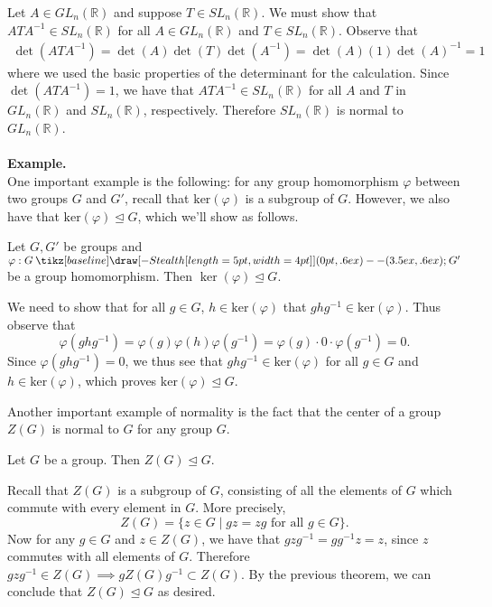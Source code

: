 \documentclass[12pt,letterpaper]{algebra_book}
\renewcommand{\to}{\mathbin{\tikz[baseline] \draw[-{Stealth[length=5pt,width=4pt]}] (0pt,.6ex) -- (3.5ex,.6ex);}}
\newcommand{\normal}{\unlhd}
\renewcommand{\phi}{\varphi}
\theoremstyle{definition}
\begin{document}
    Let $A \in GL_n(\mathbb{R})$ and suppose $T
    \in SL_n(\mathbb{R})$. We must show that $ATA^{-1} \in
    SL_n(\mathbb{R})$ for all $A \in GL_n(\mathbb{R})$ and $T \in
    SL_n(\mathbb{R})$. Observe that 
    \begin{align*}
        \det(ATA^{-1}) = \det(A)\det(T)\det(A^{-1})
        = \det(A)(1)\det(A)^{-1} = 1
    \end{align*}
    where we used the basic properties of the determinant for the
    calculation. Since $\det(ATA^{-1}) = 1$, we have that $ATA^{-1}
    \in SL_n(\mathbb{R})$ for all $A$ and $T$ in $GL_n(\mathbb{R})$
    and $SL_n(\mathbb{R})$, respectively. Therefore $SL_n(\mathbb{R})$
    is normal to $GL_n(\mathbb{R})$.   
    \\
    \\
    \textbf{Example.}
    \\
    One important example is the following: for any group homomorphism
    $\phi$ between two groups $G$ and $G'$, recall that
    $\mbox{ker}(\phi)$ is a subgroup of $G$. However, we also have
    that $\mbox{ker}(\phi) \normal G$, which we'll show as follows.

    \begin{proposition}
        Let $G, G'$ be groups and $\phi: G \to G'$ be a group
        homomorphism. Then $\ker(\phi) \normal G$.
    \end{proposition}

    \begin{prf}
        We need to show that for all $g \in G$, $h \in \mbox{ker}(\phi)$
        that $ghg^{-1} \in \mbox{ker}(\phi)$. Thus observe that 
        \[
            \phi(ghg^{-1}) = \phi(g)\phi(h)\phi(g^{-1})
            = \phi(g)\cdot 0 \cdot \phi(g^{-1}) = 0.
        \]
        Since $\phi(ghg^{-1}) = 0$, we thus see that $ghg^{-1} \in
        \mbox{ker}(\phi)$ for all $g \in G$ and $h \in \mbox{ker}(\phi)$,
        which proves $\mbox{ker}(\phi) \normal G$.    
    \end{prf}

    Another important example of normality is the fact that the
    center of a group $Z(G)$ is normal to $G$ for any group $G$.

    \begin{proposition}\label{normal_center}
        Let $G$ be a group. Then $Z(G) \normal G$.
    \end{proposition}

    \begin{prf}
        Recall that $Z(G)$ is a subgroup of $G$, consisting of all the
        elements of $G$ which commute with every element in $G$. More
        precisely, 
        \[
            Z(G) = \{z \in G \mid gz = zg \text{ for all } g \in G\}.
        \]
        Now for any $g \in G$ and $z \in Z(G)$, we have that $gzg^{-1}
        = gg^{-1}z = z$, since $z$ commutes with all elements of $G$.
        Therefore $gzg^{-1} \in Z(G) \implies gZ(G)g^{-1} \subset
        Z(G)$. By the previous theorem, we can conclude that $Z(G)
        \normal G$ as desired.
    \end{prf}
\end{document}
